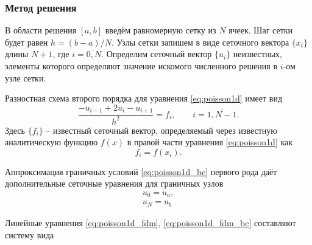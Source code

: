 \subsubsection{Метод решения}


В области решения $[a,b]$ введём равномерную сетку из $N$ ячеек.
Шаг сетки будет равен $h=(b-a)/N$.
Узлы сетки запишем в виде сеточного вектора $\{x_i\}$ длины $N+1$, где $i=\overline{0,N}$.
Определим сеточный вектор $\{u_i\}$ неизвестных, элементы которого определяют значение искомого численного решения в $i$-ом узле сетки. 

Разностная схема второго порядка для уравнения \eqref{eq:poisson1d} имеет вид
\begin{equation}
    \label{eq:poisson1d_fdm}
    \frac{-u_{i-1} + 2u_{i} - u_{i+1}}{h^2} = f_i, \qquad i=\overline{1,N-1}.
\end{equation}
Здесь $\{f_i\}$ -- известный сеточный вектор, определяемый через известную
аналитическую функцию $f(x)$ в правой части уравнения \eqref{eq:poisson1d} как
\begin{equation}
    \label{eq:poisson1d_fdm2}
    f_i = f(x_i).
\end{equation}

Аппроксимация граничных условий \eqref{eq:poisson1d_bc} первого рода даёт дополнительные 
сеточные уравнения для граничных узлов
\begin{equation}
    \label{eq:poisson1d_fdm_bc}
    \begin{array}{ll}
        u_0 = u_a,\\
        u_N = u_b
    \end{array}
\end{equation}

Линейные уравнения \eqref{eq:poisson1d_fdm}, \eqref{eq:poisson1d_fdm_bc}
составляют систему вида

